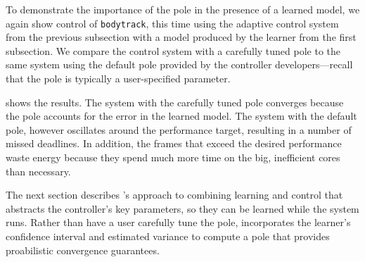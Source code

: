 To demonstrate the importance of the pole in the presence of a learned
model, we again show control of \texttt{bodytrack}, this time using
the adaptive control system from the previous subsection with a model
produced by the learner from the first subsection.  We compare the
control system with a carefully tuned pole to the same system using
the default pole provided by the controller developers---recall that
the pole is typically a user-specified parameter.  

 shows the results.  The system with the
carefully tuned pole converges because the pole accounts for the error
in the learned model.  The system with the default pole, however
oscillates around the performance target, resulting in a number of
missed deadlines.  In addition, the frames that exceed the desired
performance waste energy because they spend much more time on the big,
inefficient cores than necessary.

The next section describes \SYSTEM{}'s approach to combining learning
and control that abstracts the controller's key parameters, so they
can be learned while the system runs.  Rather than have a user
carefully tune the pole, \SYSTEM{} incorporates the learner's
confidence interval and estimated variance to compute a pole that
provides proabilistic convergence guarantees.  


